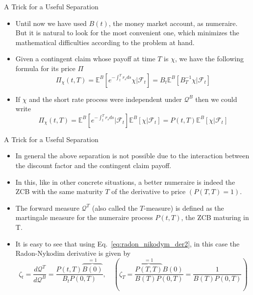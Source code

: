 \documentclass{beamer}
\begin{document}
\begin{frame}{A Trick for a Useful Separation}
	\begin{itemize}
	\item Until now we have used $B(t)$, the money market account, as numeraire. But it is natural to look for the most convenient one, which minimizes the mathematical difficulties according to the problem at hand.
	\item Given a contingent claim whose payoff at time $T$ is $\chi$, we have the following formula for its price $\Pi$
	\begin{equation*}
	\Pi_\chi(t,T)=\mathbb{E}^B\left[e^{-\int_t^T r_s ds}\chi\bigg|\mathcal{F}_t \right]=B_t\mathbb{E}^B\left[B^{-1}_T\chi|\mathcal{F}_t\right]
	\end{equation*}
	\item If $\chi$ and the short rate process were independent under $\mathcal{Q}^B$ then we could write
	\begin{equation*}
	\Pi_\chi(t,T)=\mathbb{E}^B\left[e^{-\int_t^T r_s ds}\bigg|\mathcal{F}_t\right]\mathbb{E}^B\left[\chi|\mathcal{F}_t\right] = P(t,T)\mathbb{E}^B\left[\chi|\mathcal{F}_t\right]
	\end{equation*}
	\end{itemize}
\end{frame}

\begin{frame}{A Trick for a Useful Separation}
	\begin{itemize}
		\item In general the above separation is not possible due to the interaction between the discount factor and the contingent claim payoff. 
		\item In this, like in other concrete situations, a better numeraire is indeed the ZCB with the same maturity $T$ of the derivative to price $(P(T,T)=1)$.
		\item The forward measure $\mathcal{Q}^T$ (also called the $T$-measure) is defined as the martingale measure for the numeraire process $P(t,T)$, the ZCB maturing in T.
		\item It is easy to see that using Eq.~\ref{eq:radon_nikodym_der2}, in this case the Radon-Nykodim derivative is given by
		\begin{equation}
			\zeta_t = \frac{d\mathcal{Q}^T}{d\mathcal{Q}^B} = \frac{P(t,T)\overbrace{B(0)}^{=1}}{B_t P(0,T)} ,\quad\left(\zeta_T=\frac{\overbrace{P(T,T)}^{=1}B(0)}{B(T)P(0,T)}=\frac{1}{B(T)P(0,T)}\right)
		\label{eq:radon_nikodym_t_forward}
		\end{equation}
	\end{itemize}
\end{frame}
\end{document}
